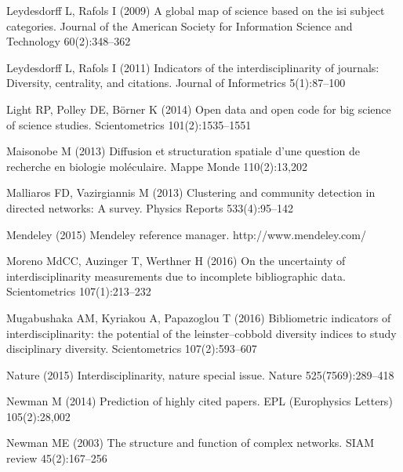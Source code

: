 \documentclass[10pt]{article}
\begin{document}
\begin{thebibliography}{84}
Leydesdorff L, Rafols I (2009) A global map of science based on the isi subject
  categories. Journal of the American Society for Information Science and
  Technology 60(2):348--362

Leydesdorff L, Rafols I (2011) Indicators of the interdisciplinarity of
  journals: Diversity, centrality, and citations. Journal of Informetrics
  5(1):87--100

Light RP, Polley DE, B{\"o}rner K (2014) Open data and open code for big
  science of science studies. Scientometrics 101(2):1535--1551

Maisonobe M (2013) Diffusion et structuration spatiale d'une question de
  recherche en biologie mol{\'e}culaire. Mappe Monde 110(2):13,202

Malliaros FD, Vazirgiannis M (2013) Clustering and community detection in
  directed networks: A survey. Physics Reports 533(4):95--142

Mendeley (2015) Mendeley reference manager. http://www.mendeley.com/

Moreno MdCC, Auzinger T, Werthner H (2016) On the uncertainty of
  interdisciplinarity measurements due to incomplete bibliographic data.
  Scientometrics 107(1):213--232

Mugabushaka AM, Kyriakou A, Papazoglou T (2016) Bibliometric indicators of
  interdisciplinarity: the potential of the leinster--cobbold diversity indices
  to study disciplinary diversity. Scientometrics 107(2):593--607

Nature (2015) Interdisciplinarity, nature special issue. Nature
  525(7569):289--418

Newman M (2014) Prediction of highly cited papers. EPL (Europhysics Letters)
  105(2):28,002

Newman ME (2003) The structure and function of complex networks. SIAM review
  45(2):167--256


\end{thebibliography}
\end{document}
